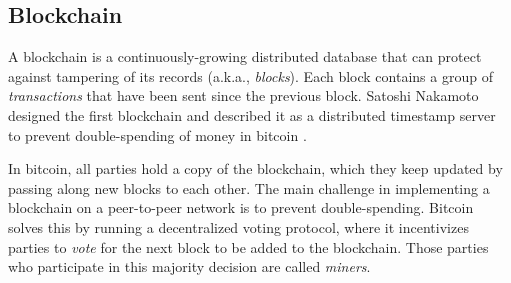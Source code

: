 \documentclass[11pt]{article}
\theoremstyle{plain}
\begin{document}
\subsection{Blockchain}

A blockchain is a continuously-growing distributed database that can
protect against tampering of its records (a.k.a., \emph{blocks}).
Each block contains a group of \emph{transactions} that have been
sent since the previous block. Satoshi Nakamoto designed the first
blockchain and described it as a distributed timestamp server to prevent
double-spending of money in bitcoin \cite{nakamoto08bitcoin}.

In bitcoin, all parties hold a copy of the blockchain, which they
keep updated by passing along new blocks to each other. The main challenge
in implementing a blockchain on a peer-to-peer network is to prevent
double-spending. Bitcoin solves this by running a decentralized voting
protocol, where it incentivizes parties to \emph{vote} for the next
block to be added to the blockchain. Those parties who participate
in this majority decision are called \emph{miners}. 
\end{document}
